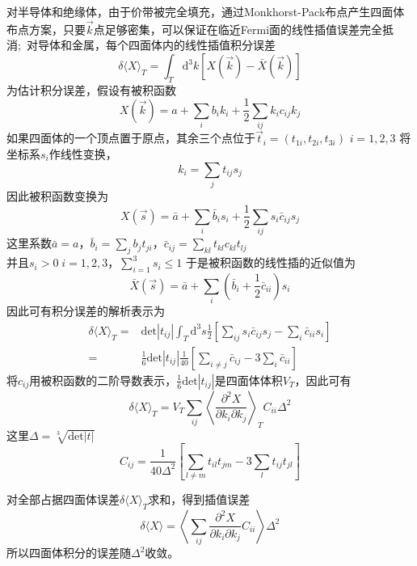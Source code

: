 对半导体和绝缘体，由于价带被完全填充，通过\textrm{Monkhorst-Pack}布点产生四面体布点方案，只要$\vec k$点足够密集，可以保证在临近\textrm{Fermi}面的线性插值误差完全抵消;~对导体和金属，每个四面体内的线性插值积分误差
\begin{equation}
	\delta\langle X\rangle_T=\int_T\mathrm{d}^3k\left[ X(\vec k)-\bar X(\vec k) \right]
  	\label{eq:solid-Tetra_metal}
\end{equation}
为估计积分误差，假设有被积函数
$$X(\vec k)=a+\sum_ib_ik_i+\frac12\sum_{ij}k_ic_{ij}k_j$$
如果四面体的一个顶点置于原点，其余三个点位于$\vec t_i=(t_{1i},t_{2i},t_{3i})$%
$i=1,2,3$
将坐标系$s_i$作线性变换，
$$k_i=\sum_jt_{ij}s_j$$
因此被积函数变换为
$$X(\vec s)=\bar a+\sum_i\bar b_is_i+\frac12\sum_{ij}s_i\bar c_{ij}s_j$$
这里系数$\bar a=a$，$\bar b_i=\sum\limits_jb_jt_{ji}$，$\bar c_{ij}=\sum\limits_{kl}t_{kl}c_{kl}t_{lj}$\\
并且$s_i>0\;i=1,2,3$，$\sum\limits_{i=1}^3s_i\leqslant1$
于是被积函数的线性插的近似值为
$$\bar X(\vec s)=\bar a+\sum_i(\bar b_i+\frac12\bar c_{ii})s_i$$
因此可有积分误差的解析表示为
	\begin{displaymath}
		\begin{aligned}
			\delta\langle X\rangle_T=&\mathrm{det}|t_{ij}|\int_T\mathrm{d}^3s\frac12\left[ \sum_{ij}s_i\bar c_{ij}s_j-\sum_i\bar c_{ii}s_i \right]\\
			=&\frac16\mathrm{det}|t_{ij}|\frac1{40}\left[ \sum_{i\neq j}\bar c_{ij}-3\sum_i\bar c_{ii} \right]
		\end{aligned}
	\end{displaymath}
将$c_{ij}$用被积函数的二阶导数表示，$\frac16\mathrm{det}|t_{ij}|$是四面体体积$V_T$，因此可有
	\begin{displaymath}
		\delta\langle X\rangle_T=V_T\sum_{ij}\left\langle\frac{\partial^2X}{\partial k_i\partial k_j}\right\rangle_TC_{ii}\Delta^2
	\end{displaymath}
这里$\Delta=\sqrt[3]{\mathrm{det}|t|}$
	$$C_{ij}=\frac1{40\Delta^2}\left[ \sum_{l\neq m}t_{il}t_{jm}-3\sum_lt_{ij}t_{jl} \right]$$

对全部占据四面体误差$\delta\langle X\rangle_T$求和，得到插值误差
	\begin{equation}
		\delta\langle X\rangle=\left\langle\sum_{ij}\frac{\partial^2X}{\partial k_i\partial k_j}C_{ii}\right\rangle\Delta^2
		\label{eq:kpoint_Tetra_error}
	\end{equation}
所以四面体积分的误差随$\Delta^2$收敛。

